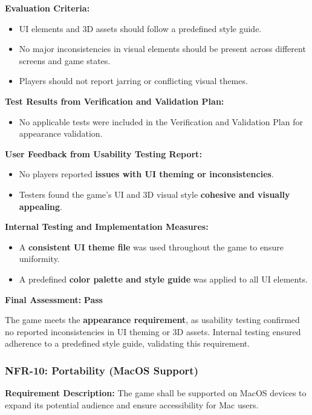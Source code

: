 \documentclass[12pt, titlepage]{article}
\begin{document}
\textbf{Evaluation Criteria:}  
\begin{itemize}
    \item UI elements and 3D assets should follow a predefined style guide.
    \item No major inconsistencies in visual elements should be present across different screens and game states.
    \item Players should not report jarring or conflicting visual themes.
\end{itemize}

\textbf{Test Results from Verification and Validation Plan:}  
\begin{itemize}
    \item No applicable tests were included in the Verification and Validation Plan for appearance validation.
\end{itemize}

\textbf{User Feedback from Usability Testing Report:}  
\begin{itemize}
    \item No players reported \textbf{issues with UI theming or inconsistencies}.
    \item Testers found the game’s UI and 3D visual style \textbf{cohesive and visually appealing}.
\end{itemize}

\textbf{Internal Testing and Implementation Measures:}  
\begin{itemize}
    \item A \textbf{consistent UI theme file} was used throughout the game to ensure uniformity.
    \item A predefined \textbf{color palette and style guide} was applied to all UI elements.
\end{itemize}

\textbf{Final Assessment:} \textbf{Pass}  

The game meets the \textbf{appearance requirement}, as usability testing confirmed no reported inconsistencies in UI theming or 3D assets. Internal testing ensured adherence to a predefined style guide, validating this requirement.


\subsubsection{NFR-10: Portability (MacOS Support)}
\label{NFR10}

\textbf{Requirement Description:}  
The game shall be supported on MacOS devices to expand its potential audience and ensure accessibility for Mac users.
\end{document}

